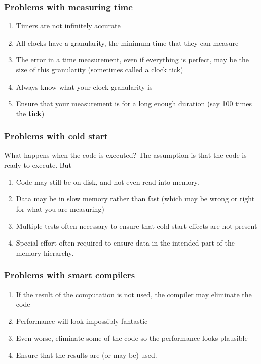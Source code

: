 \documentclass{beamer}
\begin{document}
\begin{frame}
\frametitle{Problems with measuring time}

\begin{enumerate}
\item Timers are not infinitely accurate

\item All clocks have a granularity, the minimum time that they can measure

\item The error in a time measurement, even if everything is perfect, may be the size of this granularity (sometimes called a clock tick)

\item Always know what your clock granularity is

\item Ensure that your measurement is for a long enough duration (say 100 times the \textbf{tick})
\end{enumerate}

\noindent
\end{frame}

\begin{frame}
\frametitle{Problems with cold start}

What happens when the code is executed? The assumption is that the code is ready to
execute. But
\begin{enumerate}
\item Code may still be on disk, and not even read into memory.

\item Data may be in slow memory rather than fast (which may be wrong or right for what you are measuring)

\item Multiple tests often necessary to ensure that cold start effects are not present

\item Special effort often required to ensure data in the intended part of the memory hierarchy.
\end{enumerate}

\noindent
\end{frame}

\begin{frame}
\frametitle{Problems with smart compilers}

\begin{enumerate}
\item If the result of the computation is not used, the compiler may eliminate the code

\item Performance will look impossibly fantastic

\item Even worse, eliminate some of the code so the performance looks plausible

\item Ensure that the results are (or may be) used.
\end{enumerate}

\noindent
\end{frame}
\end{document}
